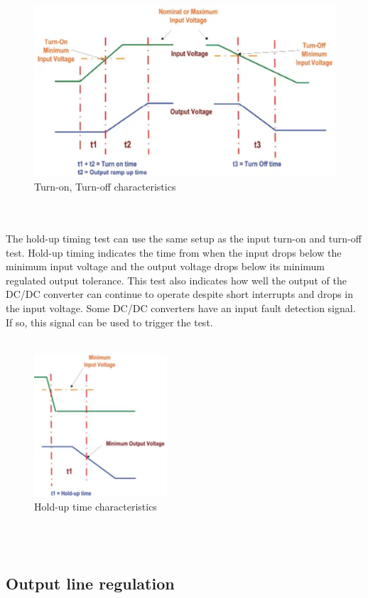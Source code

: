 \begin{figure}[h]
	\centering
	\includegraphics[width=\columnwidth]{IMGS/TurnOnTurnOff.png}
	\caption{Turn-on, Turn-off characteristics}
	\label{fig:arch}
\end{figure} 
\\ \\	
The hold-up timing test can use the same setup as the input turn-on and turn-off test. Hold-up timing indicates the time from when the input drops below the minimum input voltage and the output voltage drops below its minimum regulated output tolerance. This test also indicates how well the output of the DC/DC converter can continue to operate despite short interrupts and drops in the input voltage. Some DC/DC converters have an input fault detection signal. If so, this signal can be used to trigger the test.
\\ \\
\begin{figure}[h]
	\centering
	\includegraphics[width=140pt]{IMGS/HoldUpTimeTest.png}
	\caption{Hold-up time characteristics}
	\label{fig:arch}
\end{figure} 
\\ \\
\subsection{Output line regulation}

